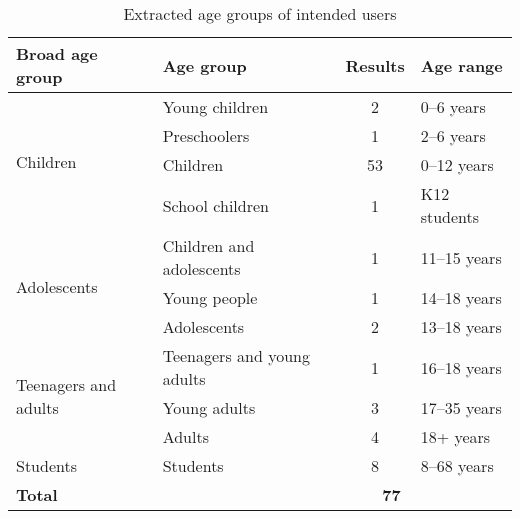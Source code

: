\documentclass[utf8,english]{gradu3}
\begin{document}
\begin{table}[h]
  \centering
  \begin{tabular}{|l|p{5cm}|c|l|}
    \hline
    \textbf{Broad age group}              & \textbf{Age group}                   & \textbf{Results} & \textbf{Age range} \\ \hline
    \multirow{4}{*}{Children}             & Young children                       & 2                & 0--6 years         \\
                                          & Preschoolers                         & 1                & 2--6 years         \\
                                          & Children                             & 53               & 0--12 years        \\
                                          & School children                      & 1                & K12 students       \\ \hline
    \multirow{3}{*}{Adolescents}          & Children and adolescents             & 1                & 11--15 years       \\
                                          & Young people                         & 1                & 14--18 years       \\
                                          & Adolescents                          & 2                & 13--18 years       \\ \hline
    \multirow{3}{*}{Teenagers and adults} & Teenagers and young adults           & 1                & 16--18 years       \\
                                          & Young adults                         & 3                & 17--35 years       \\
                                          & Adults                               & 4                & 18+ years          \\ \hline
    Students                              & Students                             & 8                & 8--68 years        \\ \hline
    \multicolumn{2}{|l|}{\textbf{Total}}  & \multicolumn{2}{l|}{\textbf{~~~~77}}                                         \\ \hline%
  \end{tabular}
  \caption{Extracted age groups of intended users}
  \label{agegroups}
\end{table}
\end{document}
